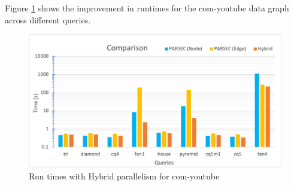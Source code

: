 Figure \ref{fig:hybrid-par-speedups} shows the improvement in runtimes for the com-youtube data graph across different queries.

\begin{figure}
    \includegraphics[width=\textwidth]{fig/improvements/Hybrid-parallelism-speedups.png}
    \caption{Run times with Hybrid parallelism for com-youtube}
    \label{fig:hybrid-par-speedups}
\end{figure}
